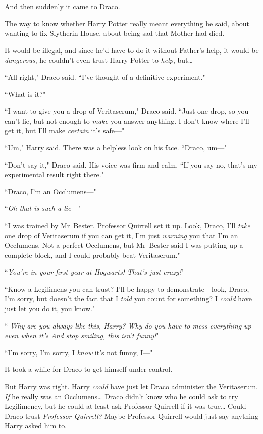 And then suddenly it came to Draco.

The way to know whether Harry Potter really meant everything he said, about wanting to fix Slytherin House, about being sad that Mother had died.

It would be illegal, and since he'd have to do it without Father's help, it would be \emph{dangerous}, he couldn't even trust Harry Potter to \emph{help}, but{\ldots}

``All right," Draco said. ``I've thought of a definitive experiment."

``What is it?"

``I want to give you a drop of Veritaserum," Draco said. ``Just one drop, so you can't lie, but not enough to \emph{make} you answer anything. I don't know where I'll get it, but I'll make \emph{certain} it's safe—"

``Um," Harry said. There was a helpless look on his face. ``Draco, um—"

``Don't say it," Draco said. His voice was firm and calm. ``If you say no, that's my experimental result right there."

``Draco, I'm an Occlumens—"

``\emph{Oh that is such a lie—}"

``I was trained by Mr~Bester. Professor Quirrell set it up. Look, Draco, I'll \emph{take} one drop of Veritaserum if you can get it, I'm just \emph{warning} you that I'm an Occlumens. Not a perfect Occlumens, but Mr~Bester said I was putting up a complete block, and I could probably beat Veritaserum."

``\emph{You're in your first year at Hogwarts! That's just crazy!}"

``Know a Legilimens you can trust? I'll be happy to demonstrate—look, Draco, I'm sorry, but doesn't the fact that I \emph{told} you count for something? I \emph{could} have just let you do it, you know."

``\emph{ Why are you always like this, Harry? Why do you have to mess everything up even when it's  And stop smiling, this isn't funny!}"

``I'm sorry, I'm sorry, I \emph{know} it's not funny, I—"

It took a while for Draco to get himself under control.

But Harry was right. Harry \emph{could} have just let Draco administer the Veritaserum. \emph{If} he really was an Occlumens{\ldots} Draco didn't know who he could ask to try Legilimency, but he could at least ask Professor Quirrell if it was true{\ldots} Could Draco trust \emph{Professor Quirrell?} Maybe Professor Quirrell would just say anything Harry asked him to.

